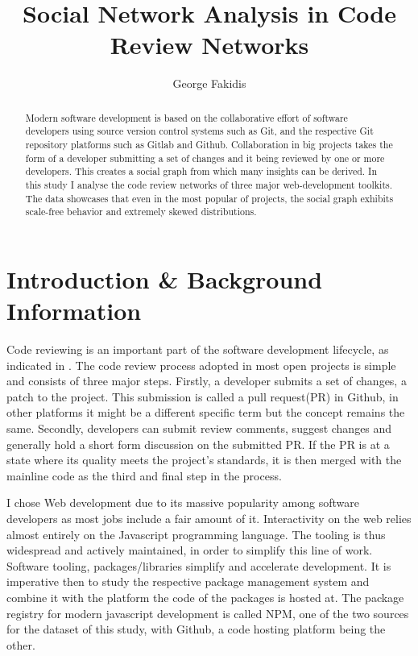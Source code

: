 \documentclass{article}
\author{George Fakidis}
\title{Social Network Analysis in Code Review Networks}
\begin{document}
\maketitle
\begin{abstract}
	Modern software development is based on the collaborative effort of software developers using source version control systems such as Git, and the respective Git repository platforms such as Gitlab and Github. 
	Collaboration in big projects takes the form of a developer submitting a set of changes and it being reviewed by one or more developers. 
	This creates a social graph from which many insights can be derived. In this study I analyse the code review networks of three major web-development toolkits.
	The data showcases that even in the most popular of projects, the social graph exhibits scale-free behavior and extremely skewed distributions.
\end{abstract}
\section{Introduction \& Background Information}
Code reviewing is an important part of the software development lifecycle, as indicated in \cite{thompson_large-scale_2017}. The code review process adopted in most open projects is simple and consists of three major steps. Firstly, a developer submits a set of changes, a patch to the project. This submission is called a pull request(PR) in Github, in other platforms it might be a different specific term but the concept remains the same. 
Secondly, developers can submit review comments, suggest changes and generally hold a short form discussion on the submitted PR. If the PR is at a state where its quality meets the project's standards, it is then merged with the mainline code as the third and final step in the process. 

I chose Web development due to its massive popularity among software developers as most jobs include a fair amount of it. Interactivity on the web relies almost entirely on the Javascript programming language. The tooling is thus widespread and actively maintained, in order to simplify this line of work. Software tooling, packages/libraries simplify and accelerate development. It is imperative then to study the respective package management system and combine it with the platform the code of the packages is hosted at. The package registry for modern javascript development is called NPM, one of the two sources for the dataset of this study, with Github, a code hosting platform being the other.
\end{document}
